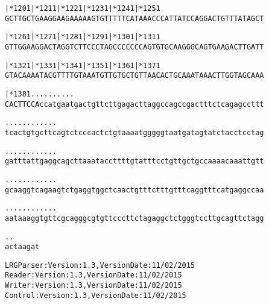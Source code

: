 \documentclass{article}
\begin{document}
\begin{alltt}
     |*1201    |*1211    |*1221    |*1231    |*1241    |*1251
GCTTGCTGAAGGAAGAAAAAGTGTTTTTCATAAACCCATTATCCAGGACTGTTTATAGCT

     |*1261    |*1271    |*1281    |*1291    |*1301    |*1311
GTTGGAAGGACTAGGTCTTCCCTAGCCCCCCCAGTGTGCAAGGGCAGTGAAGACTTGATT

     |*1321    |*1331    |*1341    |*1351    |*1361    |*1371
GTACAAAATACGTTTTGTAAATGTTGTGCTGTTAACACTGCAAATAAACTTGGTAGCAAA

     |*1381 .    .    .    .    .    .    .    .    .    .  
CACTTCCAccatgaatgactgttcttgagacttaggccagccgactttctcagagccttt

  .    .    .    .    .    .    .    .    .    .    .    .  
tcactgtgcttcagtctcccactctgtaaaatgggggtaatgatagtatctacctcctag

  .    .    .    .    .    .    .    .    .    .    .    .  
gatttattgaggcagcttaaataccttttgtatttcctgttgctgccaaaacaaattgtt

  .    .    .    .    .    .    .    .    .    .    .    .  
gcaaggtcagaagtctgaggtggctcaactgtttctttgtttcaggtttcatgaggccaa

  .    .    .    .    .    .    .    .    .    .    .    .  
aataaaggtgttcgcagggcgtgttcccttctagaggctctgggtccttgcagttctagg

  .    .
actaagat
\end{alltt}
\newpage
\begin{alltt}
LRG Parser: Version: 1.3, Version Date: 11/02/2015
Reader: Version: 1.3, Version Date: 11/02/2015
Writer: Version: 1.3, Version Date: 11/02/2015
Control: Version: 1.3, Version Date: 11/02/2015
\end{alltt}
\end{document}
